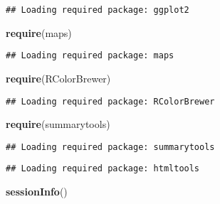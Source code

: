 \documentclass[]{article}
\newenvironment{Shaded}{\begin{snugshade}}{\end{snugshade}}
\newcommand{\KeywordTok}[1]{\textcolor[rgb]{0.13,0.29,0.53}{\textbf{#1}}}
\newcommand{\NormalTok}[1]{#1}
\begin{document}
\begin{verbatim}
## Loading required package: ggplot2
\end{verbatim}

\begin{Shaded}
\begin{Highlighting}[]
\KeywordTok{require}\NormalTok{(maps)}
\end{Highlighting}
\end{Shaded}

\begin{verbatim}
## Loading required package: maps
\end{verbatim}

\begin{Shaded}
\begin{Highlighting}[]
\KeywordTok{require}\NormalTok{(RColorBrewer)}
\end{Highlighting}
\end{Shaded}

\begin{verbatim}
## Loading required package: RColorBrewer
\end{verbatim}

\begin{Shaded}
\begin{Highlighting}[]
\KeywordTok{require}\NormalTok{(summarytools)}
\end{Highlighting}
\end{Shaded}

\begin{verbatim}
## Loading required package: summarytools
\end{verbatim}

\begin{verbatim}
## Loading required package: htmltools
\end{verbatim}

\begin{Shaded}
\begin{Highlighting}[]
\KeywordTok{sessionInfo}\NormalTok{()}
\end{Highlighting}
\end{Shaded}
\end{document}
